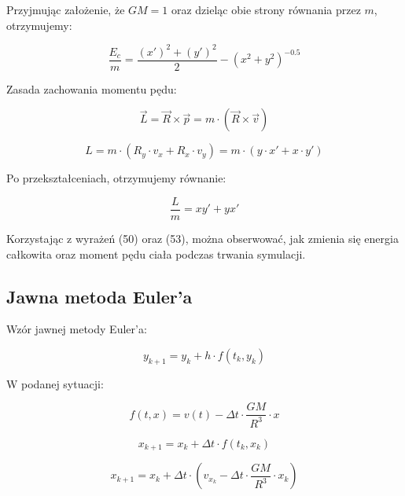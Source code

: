\documentclass{article}
\begin{document}
	Przyjmując założenie, że $GM = 1$ oraz dzieląc obie strony równania przez $m$, otrzymujemy:

	\begin{equation}
		\frac{E_c}{m} = \frac{(x')^2+(y')^2}{2} - (x^2+y^2)^{-0.5}
	\end{equation}

	

	Zasada zachowania momentu pędu:

	\begin{equation}
		\overrightarrow{L} = \overrightarrow{R} \times \overrightarrow{p} = m \cdot (\overrightarrow{R} \times \overrightarrow{v})
	\end{equation}

	\begin{equation}
		L = m \cdot (R_y \cdot v_x + R_x \cdot v_y) = m \cdot (y \cdot x' + x \cdot y')
	\end{equation}

	Po przekształceniach, otrzymujemy równanie:

	\begin{equation}
		\frac{L}{m} = xy'+yx'
	\end{equation}

	Korzystając z wyrażeń (50) oraz (53), można obserwować, jak zmienia się energia całkowita oraz moment pędu ciała podczas trwania symulacji.


	\subsection*{Jawna metoda Euler'a}

	Wzór jawnej metody Euler'a:

	\begin{equation}
		y_{k+1} = y_k + h \cdot f(t_k, y_k)
	\end{equation}

	W podanej sytuacji:

	\begin{equation}
		f(t, x) = v(t) - \Delta t \cdot \frac{GM}{R^3} \cdot x
	\end{equation}

	\begin{equation}
		x_{k+1} = x_k + \Delta t \cdot f(t_k, x_k)
	\end{equation}

	\begin{equation}
		x_{k+1} = x_k + \Delta t \cdot (v_{x_k} - \Delta t \cdot \frac{GM}{R^3} \cdot x_k) 
	\end{equation}
\end{document}
